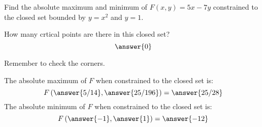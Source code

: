 \documentclass{ximera}
\author{Gregory Hartman \and Bart Snapp}
\begin{document}
\begin{exercise}
  Find the absolute maximum and minimum of $F(x,y) = 5x-7y$ constrained to the closed set bounded by $y=x^2$ and $y=1$.
  
  \begin{prompt}
    How many crtical points are there in this closed set?
    \[
    \answer{0}
    \]
    \begin{exercise}
    \begin{hint}
      Remember to check the corners.
    \end{hint}
    The absolute maximum of $F$ when constrained to the closed set is:
    \[
    F\left(\answer{5/14},\answer{25/196}\right) = \answer{25/28}
    \]
    The absolute minimum of $F$ when constrained to the closed set is:
    \[
    F\left(\answer{-1},\answer{1}\right) = \answer{-12}
    \]
  \end{exercise}
  \end{prompt}
\end{exercise}
\end{document}
